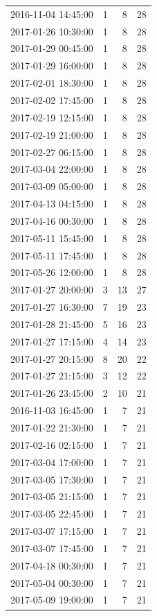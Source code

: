 \begin{tabular}{lrrr}
2016-11-04 14:45:00 & 1 & 8 & 28 \\
2017-01-26 10:30:00 & 1 & 8 & 28 \\
2017-01-29 00:45:00 & 1 & 8 & 28 \\
2017-01-29 16:00:00 & 1 & 8 & 28 \\
2017-02-01 18:30:00 & 1 & 8 & 28 \\
2017-02-02 17:45:00 & 1 & 8 & 28 \\
2017-02-19 12:15:00 & 1 & 8 & 28 \\
2017-02-19 21:00:00 & 1 & 8 & 28 \\
2017-02-27 06:15:00 & 1 & 8 & 28 \\
2017-03-04 22:00:00 & 1 & 8 & 28 \\
2017-03-09 05:00:00 & 1 & 8 & 28 \\
2017-04-13 04:15:00 & 1 & 8 & 28 \\
2017-04-16 00:30:00 & 1 & 8 & 28 \\
2017-05-11 15:45:00 & 1 & 8 & 28 \\
2017-05-11 17:45:00 & 1 & 8 & 28 \\
2017-05-26 12:00:00 & 1 & 8 & 28 \\
2017-01-27 20:00:00 & 3 & 13 & 27 \\
2017-01-27 16:30:00 & 7 & 19 & 23 \\
2017-01-28 21:45:00 & 5 & 16 & 23 \\
2017-01-27 17:15:00 & 4 & 14 & 23 \\
2017-01-27 20:15:00 & 8 & 20 & 22 \\
2017-01-27 21:15:00 & 3 & 12 & 22 \\
2017-01-26 23:45:00 & 2 & 10 & 21 \\
2016-11-03 16:45:00 & 1 & 7 & 21 \\
2017-01-22 21:30:00 & 1 & 7 & 21 \\
2017-02-16 02:15:00 & 1 & 7 & 21 \\
2017-03-04 17:00:00 & 1 & 7 & 21 \\
2017-03-05 17:30:00 & 1 & 7 & 21 \\
2017-03-05 21:15:00 & 1 & 7 & 21 \\
2017-03-05 22:45:00 & 1 & 7 & 21 \\
2017-03-07 17:15:00 & 1 & 7 & 21 \\
2017-03-07 17:45:00 & 1 & 7 & 21 \\
2017-04-18 00:30:00 & 1 & 7 & 21 \\
2017-05-04 00:30:00 & 1 & 7 & 21 \\
2017-05-09 19:00:00 & 1 & 7 & 21 \\

\end{tabular}
